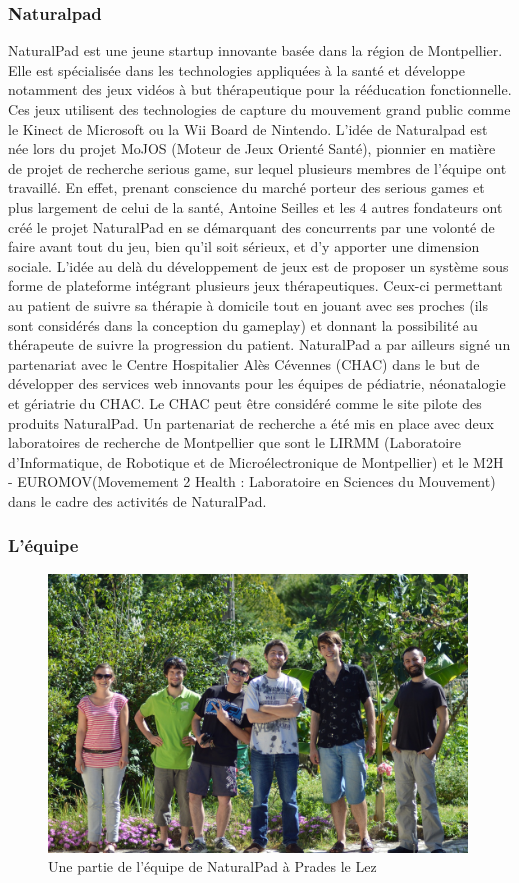 	\subsubsection{Naturalpad}
NaturalPad est une jeune startup innovante basée dans la région de Montpellier. Elle est spécialisée dans les technologies appliquées à la santé et développe notamment des jeux vidéos à but thérapeutique pour la rééducation fonctionnelle. Ces jeux utilisent des technologies de capture du mouvement grand public comme le Kinect de Microsoft ou la Wii Board de Nintendo. L’idée de Naturalpad est née lors du projet MoJOS (Moteur de Jeux Orienté Santé), pionnier en matière de projet de recherche serious game, sur lequel plusieurs membres de l’équipe ont travaillé. En effet, prenant conscience du marché porteur des serious games et plus largement de celui de la santé, Antoine Seilles et les 4 autres fondateurs ont créé le projet NaturalPad en se démarquant des concurrents par une volonté de faire avant tout du jeu, bien qu’il soit sérieux, et d’y apporter une dimension sociale. L’idée au delà du développement de jeux est de proposer un système sous forme de plateforme intégrant plusieurs jeux thérapeutiques. Ceux-ci permettant au patient de suivre sa thérapie à domicile tout en jouant avec ses proches (ils sont considérés dans la conception du gameplay) et donnant la possibilité au thérapeute de suivre la progression du patient. NaturalPad a par ailleurs signé un partenariat avec le Centre Hospitalier Alès Cévennes (CHAC) dans le but de développer des services web innovants pour les équipes de pédiatrie, néonatalogie et gériatrie du CHAC. Le CHAC peut être considéré comme le site pilote des produits NaturalPad. Un partenariat de recherche a été mis en place avec deux laboratoires de recherche de Montpellier que sont le LIRMM (Laboratoire d’Informatique, de Robotique et de Microélectronique de Montpellier) et le M2H - EUROMOV(Movemement 2 Health : Laboratoire en Sciences du Mouvement) dans le cadre des activités de NaturalPad.

	\subsubsection{L'équipe}
	\begin{figure}[!h]
		\centering
		\includegraphics[width=420px]{images/naturalpad_groupe.jpg}
		\caption{Une partie de l'équipe de NaturalPad à Prades le Lez}
		\label{naturalpad_groupe}
	\end{figure}
	
